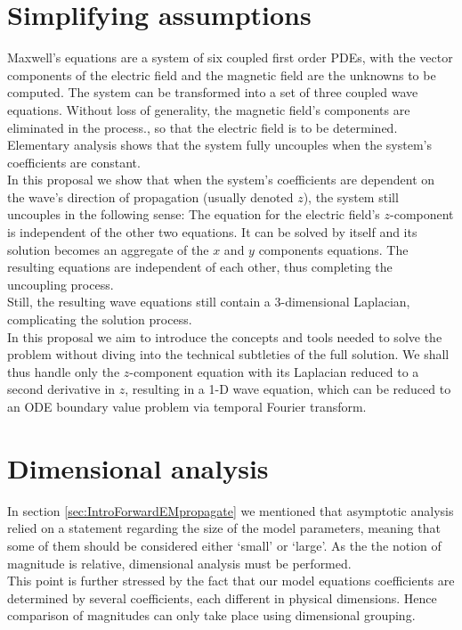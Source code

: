 \documentclass[12pt,twoside]{report}
\begin{document}
\section{Simplifying assumptions}
Maxwell's equations are a system of six coupled first order PDEs, with the vector components of the electric field and the magnetic field are the unknowns to be computed. The system can be transformed into a set of three coupled wave equations. Without loss of generality, the magnetic field's components are eliminated in  the process., so that the electric field is to be determined.\\ 
Elementary analysis shows that the system fully uncouples when the system's coefficients are constant.\\
In this proposal we show that when the system's coefficients are dependent on the wave's direction of propagation (usually denoted $z$), the system still uncouples in the following sense: The equation for the electric field's $z$-component is independent of the other two equations. It can be solved by itself and its solution becomes an aggregate of the $x$ and $y$ components equations. The resulting equations are independent of each other, thus completing the uncoupling process.\\
Still, the resulting wave equations still contain a 3-dimensional Laplacian, complicating the solution process. \\
In this proposal we aim to introduce the concepts and tools needed to solve the problem without diving into the technical subtleties of the full solution. We shall thus handle only the $z$-component equation with its Laplacian reduced to a second derivative in $z$, resulting in a 1-D wave equation, which can be reduced to an ODE boundary value problem via temporal Fourier transform.

\section{Dimensional analysis}
\label{sec:IntoDimAnaslysis}
In section \ref{sec:IntroForwardEMpropagate} we mentioned that asymptotic analysis relied on a statement regarding the size of the model parameters, meaning that some of them should be considered either `small' or `large'. As the the notion of magnitude is relative, dimensional analysis must be performed. \\
This point is further stressed by the fact that our model equations coefficients are determined by several coefficients, each different in physical dimensions. Hence comparison of magnitudes can only take place using dimensional grouping.\\
\end{document}
